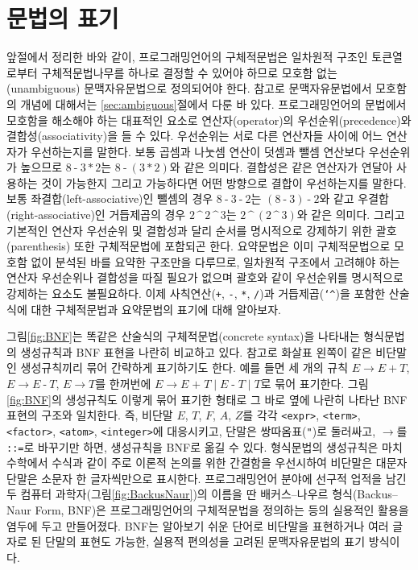 \section{문법의 표기}
\label{sec:GrammarNotation}
앞절에서 정리한 바와 같이, 프로그래밍언어의 구체적문법은 일차원적 구조인
토큰열로부터 구체적문법나무를 하나로 결정할 수 있어야 하므로 모호함 없는
(unambiguous) 문맥자유문법으로 정의되어야 한다. 참고로 문맥자유문법에서
모호함의 개념에 대해서는 \ref{sec:ambiguous}절에서 다룬 바 있다.
프로그래밍언어의 문법에서 모호함을 해소해야 하는 대표적인 요소로
연산자(operator)의 우선순위(precedence)와 결합성(associativity)을 들 수 있다.
우선순위는 서로 다른 연산자들 사이에 어느 연산자가 우선하는지를 말한다.
보통 곱셈과 나눗셈 연산이 덧셈과 뺄셈 연산보다 우선순위가 높으므로
$8\mathop{\texttt{-}} 3\mathop{\texttt{*}}2 $는
$8\mathop{\texttt{-}}(3\mathop{\texttt{*}}2)$와 같은 의미다.
결합성은 같은 연산자가 연달아 사용하는 것이 가능한지 그리고
가능하다면 어떤 방향으로 결합이 우선하는지를 말한다.
보통 좌결합(left-associative)인 뺄셈의 경우
$ 8\mathop{\texttt{-}}3 \mathop{\texttt{-}}2$는
$(8\mathop{\texttt{-}}3)\mathop{\texttt{-}}2$와 같고
우결합(right-associative)인 거듭제곱의 경우
$2\mathop{\texttt{\char`^}} 2\mathop{\texttt{\char`^}}3 $는
$2\mathop{\texttt{\char`^}}(2\mathop{\texttt{\char`^}}3)$와 같은 의미다.
그리고 기본적인 연산자 우선순위 및 결합성과 달리 순서를 명시적으로
강제하기 위한 괄호(parenthesis) 또한 구체적문법에 포함되곤 한다.
요약문법은 이미 구체적문법으로 모호함 없이 분석된 바를 요약한 구조만을 다루므로,
일차원적 구조에서 고려해야 하는 연산자 우선순위나 결합성을 따질 필요가 없으며
괄호와 같이 우선순위를 명시적으로 강제하는 요소도 불필요하다.
이제 사칙연산(\texttt{+}, \texttt{-}, \texttt{*}, \texttt{/})과
거듭제곱(\texttt{\char`^})을 포함한 산술식에 대한 구체적문법과
요약문법의 표기에 대해 알아보자.

그림\;\ref{fig:BNF}는 똑같은 산술식의 구체적문법(concrete syntax)을
나타내는 형식문법의 생성규칙과 BNF 표현을 나란히 비교하고 있다.
참고로 화살표 왼쪽이 같은 비단말인 생성규칙끼리 묶어 간략하게 표기하기도 한다.
예를 들면 세 개의 규칙
$E \to E ~\texttt{+}~ T$, $E \to E ~\texttt{-}~ T$, $E \to T$를
한꺼번에 $E \to E\;\texttt{+}\;T \mid E\;\texttt{-}\;T \mid T$로
묶어 표기한다. 그림\;\ref{fig:BNF}의 생성규칙도 이렇게 묶어 표기한 형태로
그 바로 옆에 나란히 나타난 BNF 표현의 구조와 일치한다.
즉, 비단말 $E$, $T$, $F$, $A$, $Z$를 각각 \texttt{<expr>},
\texttt{<term>}, \texttt{<factor>}, \texttt{<atom>}, \texttt{<integer>}에 대응시키고, 단말은
쌍따옴표(\texttt{"})로 둘러싸고, $\to$를 \texttt{::=}로
바꾸기만 하면, 생성규칙을 BNF로 옮길 수 있다. 형식문법의 생성규칙은
마치 수학에서 수식과 같이 주로 이론적 논의를 위한 간결함을 우선시하여
비단말은 대문자 단말은 소문자 한 글자씩만으로 표시한다.
프로그래밍언어 분야에 선구적 업적을 남긴
두 컴퓨터 과학자(그림\;\ref{fig:BackusNaur})의 이름을 딴
%
%
%
%
배커스--나우르 형식(Backus--Naur Form, BNF)은 프로그래밍언어의
구체적문법을 정의하는 등의 실용적인 활용을 염두에 두고 만들어졌다.
BNF는 알아보기 쉬운 단어로 비단말을 표현하거나 여러 글자로 된 단말의
표현도 가능한, 실용적 편의성을 고려된 문맥자유문법의 표기 방식이다.


